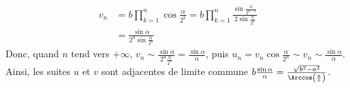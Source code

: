 {{\begin{align*}
v_n&=b\prod_{k=1}^{n}\cos\frac{\alpha}{2^k}=b\prod_{k=1}^{n}\frac{\sin\frac{\alpha}{2^{k-1}}}
{2\sin\frac{\alpha}{2^k}}\\
 &=\frac{\sin\alpha}{2^n\sin\frac{\alpha}{2^n}}
\end{align*}
Donc, quand $n$ tend vers $+\infty$, $v_n\sim\frac{\sin\alpha}{2^n\frac{\alpha}{2^n}}=\frac{\sin\alpha}{\alpha}$, puis $u_n=v_n\cos\frac{\alpha}{2^n}\sim v_n\sim\frac{\sin\alpha}{\alpha}$.
Ainsi, les suites $u$ et $v$ sont adjacentes de limite commune $b\frac{\sin\alpha}{\alpha}=\frac{\sqrt{b^2-a^2}}{\Arccos\left(\frac{a}{b}\right)}$.}
}